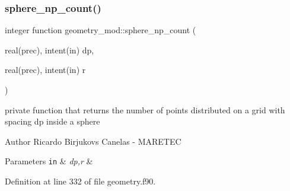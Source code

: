 \subsubsection{\texorpdfstring{sphere\+\_\+np\+\_\+count()}{sphere\_np\_count()}}
{\footnotesize\ttfamily integer function geometry\+\_\+mod\+::sphere\+\_\+np\+\_\+count (\begin{DoxyParamCaption}\item[{real(prec), intent(in)}]{dp,  }\item[{real(prec), intent(in)}]{r }\end{DoxyParamCaption})\hspace{0.3cm}{\ttfamily [private]}}



private function that returns the number of points distributed on a grid with spacing dp inside a sphere 

\begin{DoxyAuthor}{Author}
Ricardo Birjukovs Canelas -\/ M\+A\+R\+E\+T\+EC 
\end{DoxyAuthor}

\begin{DoxyParams}[1]{Parameters}
\mbox{\tt in}  & {\em dp,r} & \\
\hline
\end{DoxyParams}


Definition at line 332 of file geometry.\+f90.


